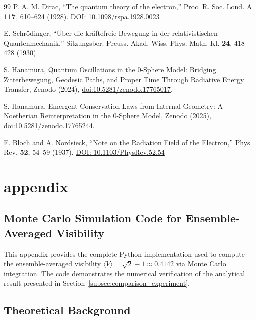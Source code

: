 \documentclass[%
 reprint,
 amsmath,amssymb,
 aps,
 prb,
]{revtex4-2}
\numberwithin{equation}{section}
\begin{document}
\begin{thebibliography}{99}
P. A. M. Dirac, ``The quantum theory of the electron,'' Proc. R. Soc. Lond. A \textbf{117}, 610--624 (1928). \href{https://doi.org/10.1098/rspa.1928.0023}{DOI: 10.1098/rspa.1928.0023}

E. Schr\"{o}dinger, ``\"{U}ber die kr\"{a}ftefreie Bewegung in der relativistischen Quantenmechanik,'' Sitzungsber. Preuss. Akad. Wiss. Phys.-Math. Kl. \textbf{24}, 418--428 (1930).

S. Hanamura, Quantum Oscillations in the 0-Sphere Model: Bridging Zitterbewegung, Geodesic Paths, and Proper Time Through Radiative Energy Transfer, Zenodo (2024), \href{https://doi.org/10.5281/zenodo.17765017}{doi:10.5281/zenodo.17765017}.

S. Hanamura, Emergent Conservation Laws from Internal Geometry: A Noetherian Reinterpretation in the 0-Sphere Model, Zenodo (2025), \href{https://doi.org/10.5281/zenodo.17765244}{doi:10.5281/zenodo.17765244}.

F. Bloch and A. Nordsieck,
``Note on the Radiation Field of the Electron,''
Phys. Rev. \textbf{52}, 54--59 (1937).
\href{https://doi.org/10.1103/PhysRev.52.54}{DOI: 10.1103/PhysRev.52.54}


\end{thebibliography}

\section{appendix}

\subsection{Monte Carlo Simulation Code for Ensemble-Averaged Visibility}
\label{app:monte_carlo}

This appendix provides the complete Python implementation used to compute the ensemble-averaged visibility $\langle V \rangle = \sqrt{2}-1 \approx 0.4142$ via Monte Carlo integration. The code demonstrates the numerical verification of the analytical result presented in Section~\ref{subsec:comparison_experiment}.


\subsection{Theoretical Background}
\end{document}
